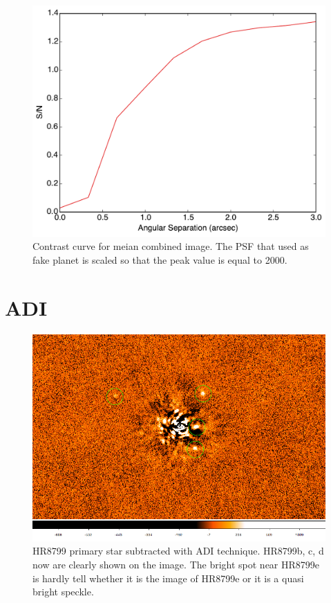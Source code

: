 \documentclass[paper=letter, fontsize=11pt]{scrartcl} %
\numberwithin{equation}{section} %
\numberwithin{figure}{section} %
\numberwithin{table}{section} %
\begin{document}
 \begin{figure}
   \centering
   \includegraphics[width=\textwidth]{median_contrastCurve_amp=2000}
   \caption{Contrast curve for meian combined image. The PSF that used
     as fake planet is scaled so that the peak value is equal to
     2000. }
   \label{fig:median_curve}
 \end{figure}
 
\section{ADI}
\begin{figure}[!h]
  \centering
  \includegraphics[width=\textwidth]{simple_ADI}
  \caption{HR8799 primary star subtracted with ADI technique. HR8799b,
    c, d now are clearly shown on the image. The bright spot near
    HR8799e is hardly tell whether it is the image of HR8799e or it is
    a quasi bright speckle.}
  \label{fig:simple_adi}
\end{figure}
\end{document}
